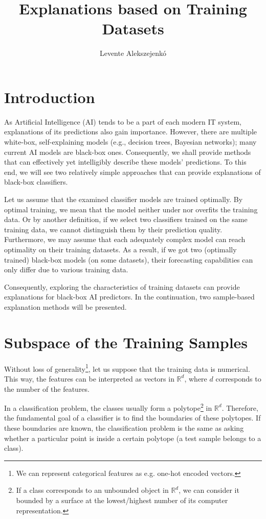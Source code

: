 \documentclass[output=paper,colorlinks,citecolor=brown
]{langscibook}
\author{Levente Alekszejenkó\orcid{0000-0002-3196-1950}\affiliation{Deparment of Measurement and Information Systems, Budapest University of Technology and Economics}
        }
\title{Explanations based on Training Datasets}
\begin{document}
\maketitle

\section{Introduction}
As Artificial Intelligence (AI) tends to be a part of each modern IT system, explanations of its predictions also gain importance. However, there are multiple white-box, self-explaining models (e.g., decision trees, Bayesian networks); many current AI models are black-box ones. Consequently, we shall provide methods that can effectively yet intelligibly describe these models' predictions. To this end, we will see two relatively simple approaches that can provide explanations of black-box classifiers.

Let us assume that the examined classifier models are trained optimally. By optimal training, we mean that the model neither under nor overfits the training data. Or by another definition, if we select two classifiers trained on the same training data, we cannot distinguish them by their prediction quality. Furthermore, we may assume that each adequately complex model can reach optimality on their training datasets. As a result, if we got two (optimally trained) black-box models (on some datasets), their forecasting capabilities can only differ due to various training data.

Consequently, exploring the characteristics of training datasets can provide explanations for black-box AI predictors. In the continuation, two sample-based explanation methods will be presented.

\section{Subspace of the Training Samples}
\label{sec:space}
Without loss of generality\footnote{We can represent categorical features as e.g. one-hot encoded vectors.}, let us suppose that the training data is numerical. This way, the features can be interpreted as vectors in $\mathbb{R}^d$, where $d$ corresponds to the number of the features.

In a classification problem, the classes usually form a polytope\footnote{If a class corresponds to an unbounded object in $\mathbb{R}^d$, we can consider it bounded by a surface at the lowest/highest number of its computer representation.} in $\mathbb{R}^d$. Therefore, the fundamental goal of a classifier is to find the boundaries of these polytopes. If these boundaries are known, the classification problem is the same as asking whether a particular point is inside a certain polytope (a test sample belongs to a class).
\end{document}
